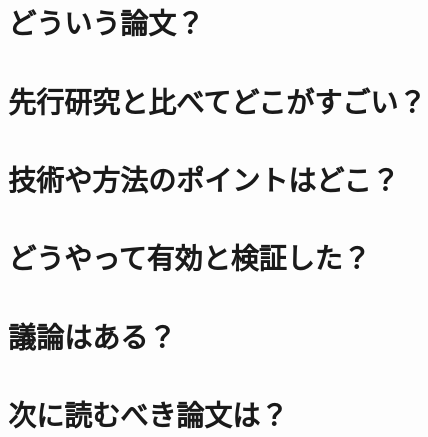 \documentclass[a4paper,10pt]{ltjsarticle}
\title{}
\author{}
\date{2022/05/03}
\newcommand{\1}{\mbox{1}\hspace{-0.25em}\mbox{l}}
\theoremstyle{definition}
\begin{document}
    \maketitle
    \abstract{}


    \section{どういう論文？}


    \section{先行研究と比べてどこがすごい？}


    \section{技術や方法のポイントはどこ？}


    \section{どうやって有効と検証した？}


    \section{議論はある？}


    \section{次に読むべき論文は？}


    
    
\end{document}
